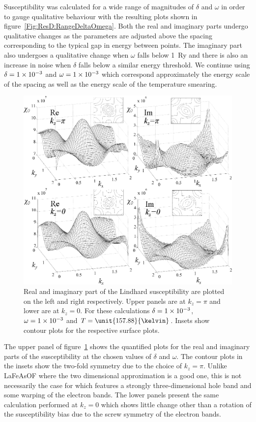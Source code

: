 Susceptibility was calculated for a wide range of magnitudes of $\delta$ and $\omega$ in order to gauge qualitative behaviour with the resulting plots shown in figure~\ref{Fig:ResD:RangeDeltaOmega}. Both the real and imaginary parts undergo qualitative changes as the parameters are adjusted above the spacing corresponding to the typical gap in energy between points. The imaginary part also undergoes a qualitative change when $\omega$ falls below \unit{1}{\textrm{Ry}} and there is also an increase in noise when $\delta$ falls below a similar energy threshold. We continue using $\delta=1\times 10^{-3}$ and $\omega=1\times 10^{-3}$ which correspond approximately the energy scale of the spacing as well as the energy scale of the temperature smearing.

\begin{figure}[htbp]
    \begin{center}
        \includegraphics[scale=0.9]{Chapter-dHvABaFe2P2/Figures/Susceptibility/2DSusceptibility/2DSusceptibilityPlusAltKz}
        \caption{Real and imaginary part of the Lindhard susceptibility are plotted on the left and right respectively. Upper panels are at $k_z=\pi$ and lower are at $k_z=0$. For these calculations $\delta=1\times 10^{-3}$, $\omega=1\times 10^{-3}$ and $T=\unit{157.88}{\kelvin}$. Insets show contour plots for the respective surface plots.}
        \label{Fig:ResD:2DSusceptibility}
    \end{center}
\end{figure}
The upper panel of figure~\ref{Fig:ResD:2DSusceptibility} shows the quantified plots for the real and imaginary parts of the susceptibility at the chosen values of $\delta$ and $\omega$. The contour plots in the insets show the two-fold symmetry due to the choice of $k_z=\pi$. Unlike LaFeAsOF where the two dimensional approximation is a good one, this is not necessarily the case for \BaFeP{} which features a strongly three-dimensional hole band and some warping of the electron bands. The lower panels present the same calculation performed at $k_z=0$ which shows little change other than a rotation of the susceptibility bias due to the screw symmetry of the electron bands.

